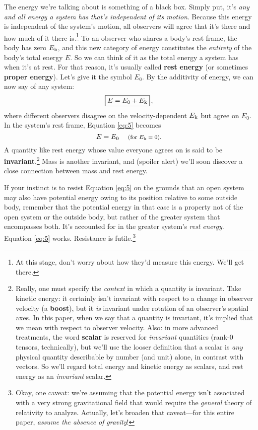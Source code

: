 \documentclass[12pt]{article}
\begin{document}
The energy we're talking about is something of a black box. Simply put, it's \emph{any and all energy a system has that's independent of its motion}. Because this energy is independent of the system's motion, all observers will agree that it's there and how much of it there is.\footnote{\label{fn:re}At this stage, don't worry about how they'd measure this energy. We'll get there.} To an observer who shares a body's rest frame, the body has zero $E_{\mkern.5mu \textrm{k}}$, and this new category of energy constitutes the \emph{entirety} of the body's total energy $E$. So we can think of it as the total energy a system has when it's at rest. For that reason, it's usually called \textbf{rest energy} (or sometimes \textbf{proper energy}). Let's give it the symbol $E_0$. By the additivity of energy, we can now say of any system:
\begin{equation}\label{eq:5}
\boxed{E=E_0+E_{\mkern.5mu \textrm{k}}} \, ,
\end{equation}
where different observers disagree on the velocity-dependent $E_{\mkern.5mu \textrm{k}}$ but agree on $E_0$. In the system's rest frame, Equation \ref{eq:5} becomes
\begin{equation}\label{eq:6}
E=E_0 \quad \textrm{\footnotesize{ (for $E_{\mkern.5mu \textrm{k}}=0$)}}.
\end{equation}
A quantity like rest energy whose value everyone agrees on is said to be \textbf{invariant}.\footnote{\label{fn:inv}Really, one must specify the \emph{context} in which a quantity is invariant. Take kinetic energy: it certainly isn't invariant with respect to a change in observer velocity (a \textbf{boost}), but it \emph{is} invariant under rotation of an observer's spatial axes. In this paper, when we say that a quantity is invariant, it's implied that we mean with respect to observer velocity. Also: in more advanced treatments, the word \textbf{scalar} is reserved for \emph{invariant} quantities (rank-0 tensors, technically), but we'll use the looser definition that a scalar is \emph{any} physical quantity describable by number (and unit) alone, in contrast with vectors. So we'll regard total energy and kinetic energy as scalars, and rest energy as an \emph{invariant} scalar.} Mass is another invariant, and (spoiler alert) we'll soon discover a close connection between mass and rest energy.

If your instinct is to resist Equation \ref{eq:5} on the grounds that an open system may also have potential energy owing to its position relative to some outside body, remember that the potential energy in that case is a property not of the open system or the outside body, but rather of the greater system that encompasses both. It's accounted for in the greater system's \emph{rest energy}. Equation \ref{eq:5} works. Resistance is futile.\footnote{Okay, one caveat: we're assuming that the potential energy isn't associated with a very strong gravitational field that would require the \emph{general} theory of relativity to analyze. Actually, let's broaden that caveat---for this entire paper, \emph{assume the absence of gravity}!}
\end{document}
